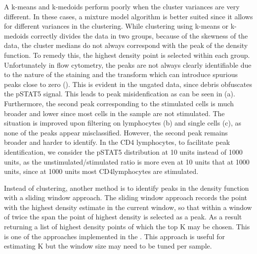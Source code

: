 A k-means and k-medoids perform poorly when the cluster variances are very different.
In these cases, a mixture model algorithm is better suited since it allows for different variances in the clustering.
While clustering using k-means or k-medoids correctly divides the data in two groups, because of the skewness of the data, the cluster medians
do not always correspond with the peak of the density function.  To remedy this, the highest density point is selected within each group.
Unfortunately in flow cytometry, the peaks are not always clearly identifiable due to the nature of the staining and the transform which can introduce
spurious peaks close to zero ().
This is evident in the ungated data, since debris obfuscates the pSTAT5 signal.
This leads to peak misidenfication as can be seen in (a).
Furthermore, the second peak corresponding to the stimulated cells is much broader and lower since most cells in the sample are not stimulated.
The situation is improved upon filtering on lymphocytes (b) and single cells (c), as none of the peaks appear misclassified.
However, the second peak remains broader and harder to identify.
In the CD4 lymphocytes, to facilitate peak identification, we consider the pSTAT5 distribution at 10 units instead of 1000 units,
as the unstimulated/stimulated ratio is more even at 10 units that at 1000 units, since at 1000 units most CD4\positive lymphocytes are stimulated.

Instead of clustering, another method is to identify peaks in the density function with a sliding window approach.
The sliding window approach records the point with the highest density estimate in the current window, so that within a window of twice the span
the point of highest density is selected as a peak.
As a result returning a list of highest density points of which the top K may be chosen.
This is one of the approaches implemented in the .
This approach is useful for estimating K but the window size may need to be tuned per sample.


